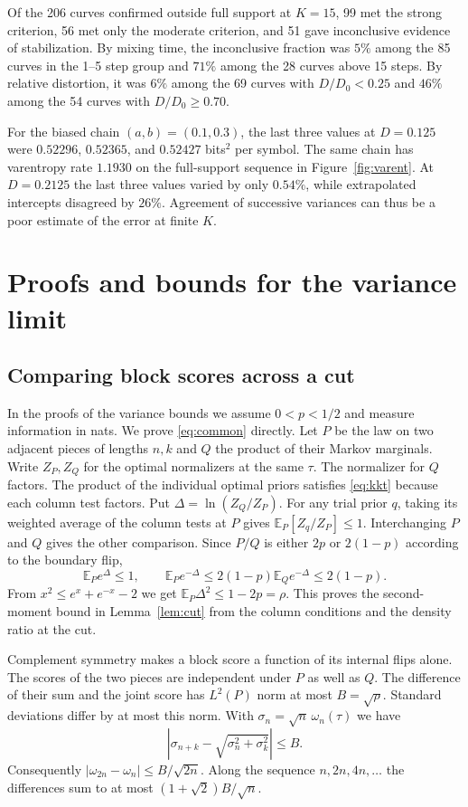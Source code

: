 \documentclass[11pt,letterpaper]{article}
\theoremstyle{definition}
\newcommand{\E}{\mathbb E}
\begin{document}
Of the 206 curves confirmed outside full support at $K=15$, 99 met the strong criterion, 56 met only the moderate criterion, and 51 gave inconclusive evidence of stabilization. By mixing time, the inconclusive fraction was $5\%$ among the 85 curves in the 1--5 step group and $71\%$ among the 28 curves above 15 steps. By relative distortion, it was $6\%$ among the 69 curves with $D/D_0<0.25$ and $46\%$ among the 54 curves with $D/D_0\ge0.70$.

For the biased chain $(a,b)=(0.1,0.3)$, the last three values at $D=0.125$ were $0.52296$, $0.52365$, and $0.52427$ bits$^2$ per symbol. The same chain has varentropy rate $1.1930$ on the full-support sequence in Figure~\ref{fig:varent}. At $D=0.2125$ the last three values varied by only $0.54\%$, while extrapolated intercepts disagreed by $26\%$. Agreement of successive variances can thus be a poor estimate of the error at finite $K$.

\section{Proofs and bounds for the variance limit}
\subsection{Comparing block scores across a cut}\label{app:split}
In the proofs of the variance bounds we assume $0<p<1/2$ and measure information in nats. We prove \eqref{eq:common} directly. Let $P$ be the law on two adjacent pieces of lengths $n,k$ and $Q$ the product of their Markov marginals. Write $Z_P,Z_Q$ for the optimal normalizers at the same $\tau$. The normalizer for $Q$ factors. The product of the individual optimal priors satisfies \eqref{eq:kkt} because each column test factors. Put $\Delta=\ln(Z_Q/Z_P)$. For any trial prior $q$, taking its weighted average of the column tests at $P$ gives $\E_P[Z_q/Z_P]\le1$. Interchanging $P$ and $Q$ gives the other comparison. Since $P/Q$ is either $2p$ or $2(1-p)$ according to the boundary flip,
\[
 \E_P e^\Delta\le1,\qquad \E_P e^{-\Delta}\le2(1-p)\E_Q e^{-\Delta}\le2(1-p).
\]
From $x^2\le e^x+e^{-x}-2$ we get $\E_P\Delta^2\le1-2p=\rho$. This proves the second-moment bound in Lemma~\ref{lem:cut} from the column conditions and the density ratio at the cut.

Complement symmetry makes a block score a function of its internal flips alone. The scores of the two pieces are independent under $P$ as well as $Q$. The difference of their sum and the joint score has $L^2(P)$ norm at most $B=\sqrt\rho$. Standard deviations differ by at most this norm. With $\sigma_n=\sqrt n\,\omega_n(\tau)$ we have
\begin{equation}
 \left|\sigma_{n+k}-\sqrt{\sigma_n^2+\sigma_k^2}\right|\le B .   \label{eq:cut}
\end{equation}
Consequently $|\omega_{2n}-\omega_n|\le B/\sqrt{2n}$. Along the sequence $n,2n,4n,\ldots$ the differences sum to at most $(1+\sqrt2)B/\sqrt n$.
\end{document}
